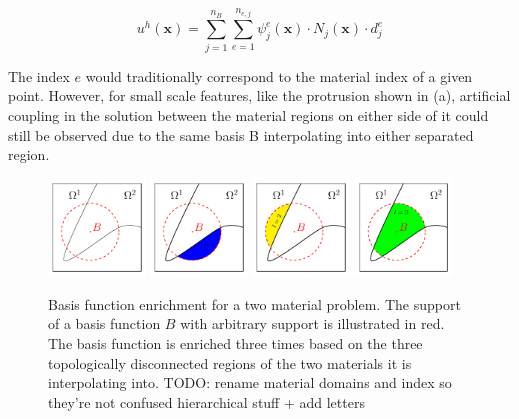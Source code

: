 \begin{equation}
\label{eqn:enrichment}
    u^h(\bm{x}) = \sum_{j = 1}^{n_B} \sum_{e = 1}^{n_{e,j}} \psi_{j}^{e}(\bm{x}) \cdot N_j(\bm{x}) \cdot d_{j}^{e}
\end{equation}{}

The index $e$ would traditionally correspond to the material index of a given point. However, for small scale features, like the protrusion shown in  (a), artificial coupling in the solution between the material regions on either side of it could still be observed due to the same basis B interpolating into either separated region.

\begin{figure}[H]
    \centering
	\centering
	\includegraphics[width=0.23\textwidth]{Figures/fig_enrichment.pdf}
	\includegraphics[width=0.23\textwidth]{Figures/fig_enrichment1.pdf}	\includegraphics[width=0.23\textwidth]{Figures/fig_enrichment2.pdf}
	\includegraphics[width=0.23\textwidth]{Figures/fig_enrichment3.pdf}
	\caption{ Basis function enrichment for a two material problem. The support of a basis function $B$ with arbitrary support is illustrated in red. The basis function is enriched three times based on the three topologically disconnected regions of the two materials it is interpolating into. {\color{red}TODO: rename material domains and index so they're not confused hierarchical stuff + add letters} }
	\label{fig:basis_function_enrichment}
\end{figure}

